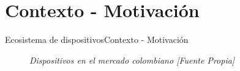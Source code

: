 \section{Contexto - Motivación}
\begin{frame}{Ecosistema de dispositivos}{Contexto - Motivación}
    \begin{figure}				
		\caption{\small \sl Dispositivos en el mercado colombiano [Fuente Propia]}
		\label{figure:Ecosistema}
    \end{figure}
\end{frame}
